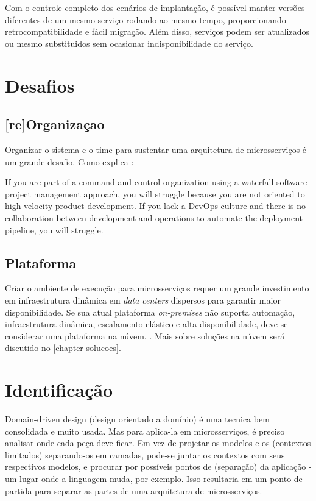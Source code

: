 Com o controle completo dos cenários de implantação, é possível manter versões diferentes de um mesmo serviço rodando ao mesmo tempo, proporcionando retrocompatibilidade e fácil migração. Além disso, serviços podem ser atualizados ou mesmo substituidos sem ocasionar indisponibilidade do serviço. \cite{Familiar2015}

\section{Desafios}

\subsection{[re]Organizaçao}

Organizar o sistema e o time para sustentar uma arquitetura de microsserviços é um grande desafio. Como explica : 
\begin{citacao}
    If you are part of a command-and-control organization using a waterfall software project management approach, you will struggle because you are not oriented to high-velocity product development. If you lack a DevOps culture and there is no collaboration between development and operations to automate the deployment pipeline, you will struggle. \cite{Familiar2015}
\end{citacao}

\subsection{Plataforma}
Criar o ambiente de execução para microsserviços requer um grande investimento em infraestrutura dinâmica em \emph{data centers} dispersos para garantir maior disponibilidade. Se sua atual plataforma \emph{on-premises} não suporta automação, infraestrutura dinâmica, escalamento elástico e alta disponibilidade, deve-se considerar uma plataforma na núvem. \cite{Familiar2015}. Mais sobre soluções na núvem será discutido no \autoref{chapter-solucoes}.

\section{Identificação}

Domain-driven design (design orientado a domínio) é uma tecnica bem consolidada e muito usada. Mas para aplica-la em microsserviços, é preciso analisar onde cada peça deve ficar. Em vez de projetar os modelos e os (contextos limitados) separando-os em camadas, pode-se juntar os contextos com seus respectivos modelos, e procurar por possíveis pontos de (separação) da aplicação - um lugar onde a linguagem muda, por exemplo. Isso resultaria em um ponto de partida para separar as partes de uma arquitetura de microsserviços. \cite{Familiar2015}


